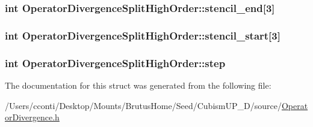 \subsubsection[{stencil\+\_\+end}]{\setlength{\rightskip}{0pt plus 5cm}int Operator\+Divergence\+Split\+High\+Order\+::stencil\+\_\+end\mbox{[}3\mbox{]}}\label{struct_operator_divergence_split_high_order_a1539bfea9c833b7d7ddf481509a417cd}
\hypertarget{struct_operator_divergence_split_high_order_a515b56b79c9da531fa0164946a497f04}{}
\subsubsection[{stencil\+\_\+start}]{\setlength{\rightskip}{0pt plus 5cm}int Operator\+Divergence\+Split\+High\+Order\+::stencil\+\_\+start\mbox{[}3\mbox{]}}\label{struct_operator_divergence_split_high_order_a515b56b79c9da531fa0164946a497f04}
\hypertarget{struct_operator_divergence_split_high_order_abcbe4e231301629b5a48c5f0b789af2b}{}
\subsubsection[{step}]{\setlength{\rightskip}{0pt plus 5cm}int Operator\+Divergence\+Split\+High\+Order\+::step}\label{struct_operator_divergence_split_high_order_abcbe4e231301629b5a48c5f0b789af2b}


The documentation for this struct was generated from the following file\+:\begin{DoxyCompactItemize}
\item 
/\+Users/cconti/\+Desktop/\+Mounts/\+Brutus\+Home/\+Seed/\+Cubism\+U\+P\+\_\+D/source/\hyperlink{_operator_divergence_8h}{Operator\+Divergence.\+h}\end{DoxyCompactItemize}
